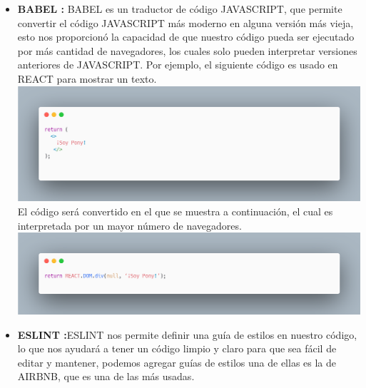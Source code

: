 \begin{itemize}
   \item \textbf{BABEL  :}   BABEL es un traductor de código JAVASCRIPT, que permite convertir el código JAVASCRIPT más moderno en alguna versión más vieja, esto nos proporcionó la capacidad de que nuestro código pueda ser ejecutado por más cantidad de navegadores, los cuales solo pueden interpretar versiones anteriores de JAVASCRIPT. Por ejemplo, el siguiente código es usado en REACT para mostrar un texto. 
   \newline
   \includegraphics[width=1\textwidth]{./Imagenes/image16.png}
   \newline
   El código será convertido en el que se muestra a continuación, el cual es interpretada por un mayor número de navegadores. 
   \newline
   \newline
   \includegraphics[width=1\textwidth]{./Imagenes/image5.png}
   \newline
   
   \item \textbf{ESLINT :}ESLINT nos permite definir una guía de estilos en nuestro código, lo que nos ayudará a tener un código limpio y claro para que sea fácil de editar y mantener, podemos agregar guías de estilos una de ellas es la de AIRBNB, que es una de las más usadas. 
   
\end{itemize}